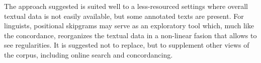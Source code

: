 \documentclass[12pt]{article}
\begin{document}

The approach suggested is suited well to a less-resourced settings
where overall textual data is not easily available, but some annotated
texts are present. For linguists, positional skipgrams may serve as an
exploratory tool which, much like the concordance, reorganizes the
textual data in a non-linear fasion that allows to see
regularities. It is suggested not to replace, but to supplement other
views of the corpus, including online search and concordancing.


\printbibliography{}
\end{document}
